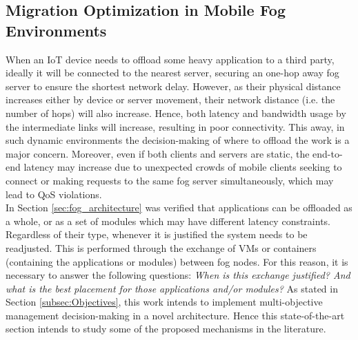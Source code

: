 \subsection{Migration Optimization in Mobile Fog Environments}
\label{sec:Migration}
\noindent When an IoT device needs to offload some heavy application to a third party, ideally it will be connected to the nearest server, securing an one-hop away fog server to ensure the shortest network delay. However, as their physical distance increases either by device or server movement, their network distance (i.e. the number of hops) will also increase. Hence, both latency and bandwidth usage by the intermediate links will increase, resulting in poor connectivity. This away, in such dynamic environments the decision-making of where to offload the work is a major concern. Moreover, even if both clients and servers are static, the end-to-end latency may increase due to unexpected crowds of mobile clients seeking to connect or making requests to the same fog server simultaneously, which may lead to QoS violations.\\
\noindent\tab In Section \ref{sec:fog_architecture} was verified that applications can be offloaded as a whole, or as a set of modules which may have different latency constraints. Regardless of their type, whenever it is justified the system needs to be readjusted. This is performed through the exchange of VMs or containers (containing the applications or modules) between fog nodes. For this reason, it is necessary to answer the following questions: \textit{When is this exchange justified? And what is the best placement for those applications and/or modules?} As stated in Section \ref{subsec:Objectives}, this work intends to implement multi-objective management decision-making in a novel architecture. Hence this state-of-the-art section intends to study some of the proposed mechanisms in the literature.

